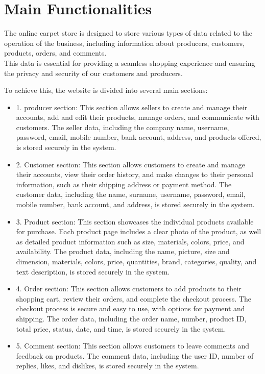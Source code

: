 \section{Main Functionalities}

The online carpet store is designed to store various types of data related to the operation of the business, including information about producers, customers, products, orders, and comments.\\
This data is essential for providing a seamless shopping experience and ensuring the privacy and security of our customers and producers.

To achieve this, the website is divided into several main sections:\\
\begin{itemize}
    \item 1. producer section: This section allows sellers to create and manage their accounts, add and edit their products, manage orders, and communicate with customers. The seller data, including the company name, username, password, email, mobile number, bank account, address, and products offered, is stored securely in the system.

    \item 2. Customer section: This section allows customers to create and manage their accounts, view their order history, and make changes to their personal information, such as their shipping address or payment method. The customer data, including the name, surname, username, password, email, mobile number, bank account, and address, is stored securely in the system.

    \item 3. Product section: This section showcases the individual products available for purchase. Each product page includes a clear photo of the product, as well as detailed product information such as size, materials, colors, price, and availability. The product data, including the name, picture, size and dimension, materials, colors, price, quantities, brand, categories, quality, and text description, is stored securely in the system.

    \item 4. Order section: This section allows customers to add products to their shopping cart, review their orders, and complete the checkout process. The checkout process is secure and easy to use, with options for payment and shipping. The order data, including the order name, number, product ID, total price, status, date, and time, is stored securely in the system.

    \item 5. Comment section: This section allows customers to leave comments and feedback on products. The comment data, including the user ID, number of replies, likes, and dislikes, is stored securely in the system.
\end{itemize}


